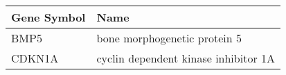 \begin{tabular}{ll}
\toprule
Gene Symbol &                                 Name \\
\midrule
       BMP5 &         bone morphogenetic protein 5 \\
     CDKN1A & cyclin dependent kinase inhibitor 1A \\
\bottomrule
\end{tabular}
